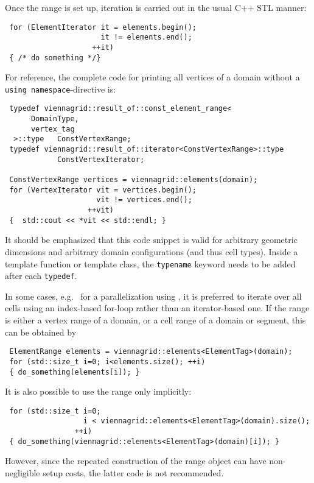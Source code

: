 Once the range is set up, iteration is carried out in the usual C++ STL manner:
\begin{lstlisting}
 for (ElementIterator it = elements.begin();
                      it != elements.end();
                    ++it)
 { /* do something */}
\end{lstlisting}
For reference, the complete code for printing all vertices of a domain without a \lstinline|using namespace|-directive is:
\begin{lstlisting}
 typedef viennagrid::result_of::const_element_range<
      DomainType,
      vertex_tag
  >::type   ConstVertexRange;
 typedef viennagrid::result_of::iterator<ConstVertexRange>::type
            ConstVertexIterator;

 ConstVertexRange vertices = viennagrid::elements(domain);
 for (VertexIterator vit = vertices.begin();
                     vit != vertices.end();
                   ++vit)
 {  std::cout << *vit << std::endl; }
\end{lstlisting}
It should be emphasized that this code snippet is valid for arbitrary geometric dimensions and arbitrary domain configurations (and thus cell types). Inside a template function or template class, the \lstinline|typename| keyword needs to be added after each \lstinline|typedef|.



In some cases, e.g.~ for a parallelization using \OpenMP \cite{openmp}, it is preferred to iterate over all cells using an index-based for-loop rather than an iterator-based one.
If the range is either a vertex range of a domain, or a cell range of a domain or segment, this can be obtained by
\begin{lstlisting}
 ElementRange elements = viennagrid::elements<ElementTag>(domain);
 for (std::size_t i=0; i<elements.size(); ++i)
 { do_something(elements[i]); }
\end{lstlisting}
It is also possible to use the range only implicitly:
\begin{lstlisting}
 for (std::size_t i=0;
                  i < viennagrid::elements<ElementTag>(domain).size();
                ++i)
 { do_something(viennagrid::elements<ElementTag>(domain)[i]); }
\end{lstlisting}
However, since the repeated construction of the range object can have non-negligible setup costs, the latter code is not recommended.


